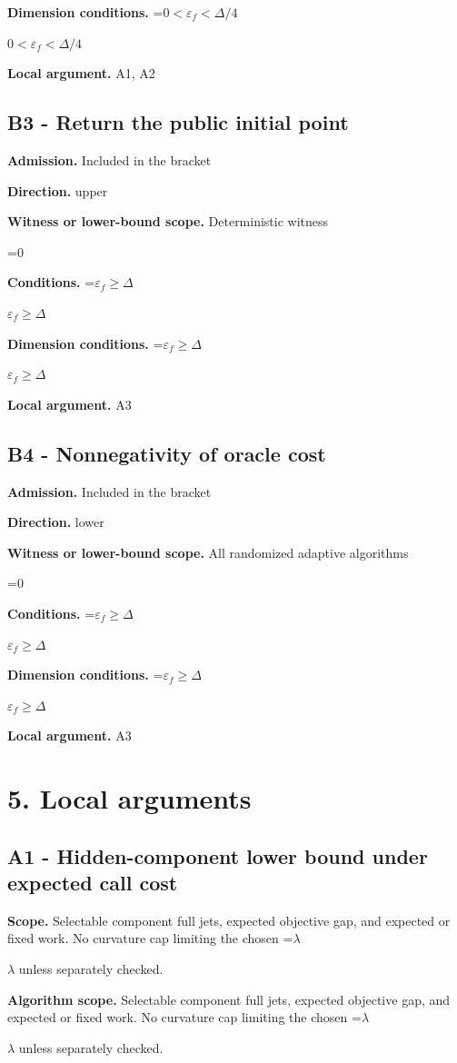 \documentclass[10pt,a4paper]{article}
\newcommand{\AtlasMath}[1]{\par\begingroup\centering\setbox0=\hbox{$\displaystyle #1$}\ifdim\wd0>1.4\linewidth\typeout{ATLAS WIDE FORMULA: \the\wd0}\fi\ifdim\wd0>\linewidth\resizebox{\linewidth}{!}{\box0}\else\box0\fi\par\endgroup}
\newcommand{\AtlasInlineMath}[1]{\begingroup\setbox0=\hbox{$#1$}\ifdim\wd0>.4\linewidth\endgroup\AtlasMath{#1}\else\endgroup$#1$\fi}
\begin{document}
\textbf{Dimension conditions.} \AtlasInlineMath{0<\varepsilon_f<\Delta/4}

\textbf{Local argument.} A1, A2

\subsection{B3 - Return the public initial point}
\textbf{Admission.} Included in the bracket

\textbf{Direction.} upper

\textbf{Witness or lower-bound scope.} Deterministic witness

\AtlasMath{0}
\textbf{Conditions.} \AtlasInlineMath{\varepsilon_f\ge\Delta}

\textbf{Dimension conditions.} \AtlasInlineMath{\varepsilon_f\ge\Delta}

\textbf{Local argument.} A3

\subsection{B4 - Nonnegativity of oracle cost}
\textbf{Admission.} Included in the bracket

\textbf{Direction.} lower

\textbf{Witness or lower-bound scope.} All randomized adaptive algorithms

\AtlasMath{0}
\textbf{Conditions.} \AtlasInlineMath{\varepsilon_f\ge\Delta}

\textbf{Dimension conditions.} \AtlasInlineMath{\varepsilon_f\ge\Delta}

\textbf{Local argument.} A3

\section{5. Local arguments}
\subsection{A1 - Hidden-component lower bound under expected call cost}
\textbf{Scope.} Selectable component full jets, expected objective gap, and expected or fixed work. No curvature cap limiting the chosen \AtlasInlineMath{\lambda} unless separately checked.

\textbf{Algorithm scope.} Selectable component full jets, expected objective gap, and expected or fixed work. No curvature cap limiting the chosen \AtlasInlineMath{\lambda} unless separately checked.
\end{document}
